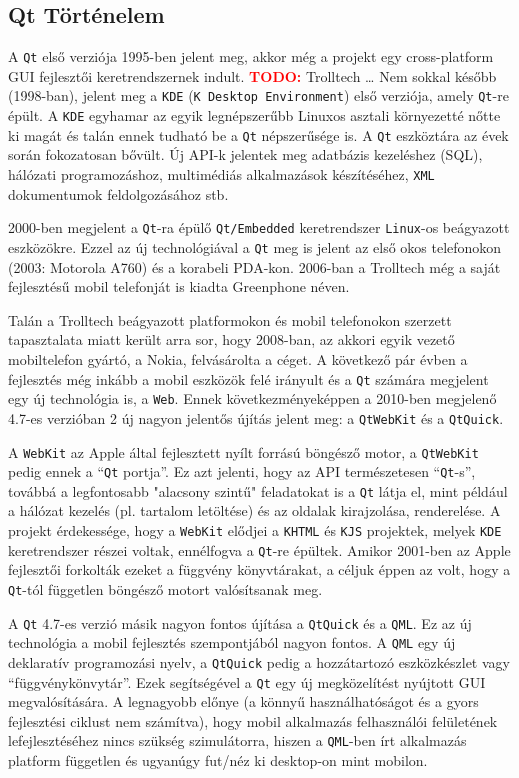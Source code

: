\documentclass[12pt]{report}
\begin{document}
\subsection{Qt Történelem}
A \texttt{Qt} első verziója 1995-ben jelent meg, akkor még a projekt egy cross-platform
GUI fejlesztői keretrendszernek indult. \textcolor{red}{\textbf{TODO:}} Trolltech \dots
Nem sokkal később (1998-ban), jelent meg a
\texttt{KDE} (\texttt{K Desktop Environment}) első verziója, amely \texttt{Qt}-re épült.
A \texttt{KDE} egyhamar az egyik legnépszerűbb Linuxos asztali környezetté nőtte ki magát
és talán ennek tudható be a \texttt{Qt} népszerűsége is.
A \texttt{Qt} eszköztára az évek során fokozatosan
bővült. Új API-k jelentek meg adatbázis kezeléshez (SQL), hálózati programozáshoz,
multimédiás alkalmazások készítéséhez, \texttt{XML} dokumentumok feldolgozásához stb.

2000-ben megjelent a \texttt{Qt}-ra épülő \texttt{Qt/Embedded} keretrendszer
\texttt{Linux}-os beágyazott eszközökre. Ezzel az új technológiával a \texttt{Qt}
meg is jelent az első okos telefonokon (2003: Motorola A760) és a korabeli PDA-kon.
2006-ban a Trolltech még a saját fejlesztésű mobil telefonját is kiadta Greenphone néven.

Talán a Trolltech beágyazott platformokon és mobil telefonokon szerzett tapasztalata
miatt került arra sor, hogy 2008-ban, az akkori egyik vezető mobiltelefon gyártó, a Nokia,
felvásárolta a céget. A következő pár évben a fejlesztés még inkább a mobil eszközök
felé irányult és a \texttt{Qt} számára megjelent egy új technológia is, a \texttt{Web}.
Ennek következményeképpen a 2010-ben megjelenő 4.7-es verzióban 2 új nagyon jelentős
újítás jelent meg: a \texttt{QtWebKit} és a \texttt{QtQuick}.

A \texttt{WebKit} az Apple által fejlesztett nyílt forrású böngésző motor, a
\texttt{QtWebKit} pedig ennek a ``\texttt{Qt} portja''. Ez azt jelenti, hogy az
API természetesen ``\texttt{Qt}-s'', továbbá a legfontosabb "alacsony szintű" feladatokat
is a \texttt{Qt} látja el, mint például a hálózat kezelés (pl. tartalom letöltése) és az
oldalak kirajzolása, renderelése. A projekt érdekessége, hogy a \texttt{WebKit} elődjei a
\texttt{KHTML} és \texttt{KJS} projektek, melyek \texttt{KDE} keretrendszer részei voltak,
ennélfogva a \texttt{Qt}-re épültek. Amikor 2001-ben az Apple fejlesztői forkolták ezeket
a függvény könyvtárakat, a céljuk éppen az volt, hogy a \texttt{Qt}-tól független
böngésző motort valósítsanak meg.

A \texttt{Qt} 4.7-es verzió másik nagyon fontos újítása a \texttt{QtQuick} és a \texttt{QML}.
Ez az új technológia a mobil fejlesztés szempontjából nagyon fontos. A \texttt{QML} egy
új deklaratív programozási nyelv, a \texttt{QtQuick} pedig a hozzátartozó eszközkészlet vagy
``függvénykönvytár''. Ezek segítségével a \texttt{Qt} egy új megközelítést nyújtott GUI
megvalósítására. A legnagyobb előnye (a könnyű használhatóságot és a gyors fejlesztési
ciklust nem számítva), hogy mobil alkalmazás felhasználói felületének
lefejlesztéséhez nincs szükség szimulátorra, hiszen a \texttt{QML}-ben írt alkalmazás
platform független és ugyanúgy fut/néz ki desktop-on mint mobilon.
\cite{bib-qt-wiki-qt-history}
\end{document}
